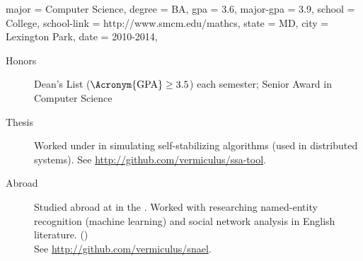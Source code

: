 \begin{education}
  {
    major = Computer Science,
    degree = BA,
    gpa = 3.6,
    major-gpa = 3.9,
    school = \StMarys College,
    school-link = http://www.smcm.edu/mathcs,
    state = MD,
    city = Lexington Park,
    date = 2010-2014,
  }

\begin{description}
\item[Honors] Dean's List ($\text{\Acronym{GPA}} \geq 3.5$) each semester;
  Senior Award in Computer Science
\item[Thesis] Worked under  in simulating
  self-stabilizing algorithms (used in distributed systems).
  See \url{http://github.com/vermiculus/ssa-tool}.
\item[Abroad] Studied abroad at
  \href{http://www.ucd.ie}{} in the
  . Worked with
   researching named-entity
  recognition (machine learning) and social network analysis in
  English literature. ()
  \\
  See \url{http://github.com/vermiculus/snael}.
\end{description}
\end{education}

